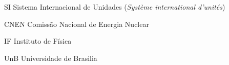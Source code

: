 \begin{siglas}
  \item[SI] Sistema Internacional de Unidades (\textit{Système international d'unités})
  \item[CNEN] Comissão Nacional de Energia Nuclear
  \item[IF] Instituto de Física
  \item[UnB] Universidade de Brasilia
\end{siglas}